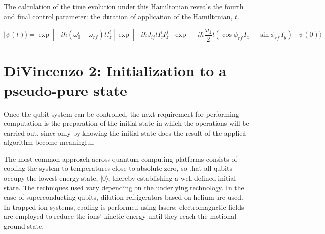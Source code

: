 The calculation of the time evolution under this Hamiltonian reveals the fourth and final control parameter: the duration of application of the Hamiltonian, \(t\).

\begin{equation}
\lvert\psi(t)\rangle =
\exp\!\left[-i\hbar(\omega_{0}^i-\omega_{rf})tI_z^i\right]
\exp\!\left[-i\hbar J_{ij}tI_z^i I_z^j\right]
\exp\!\left[-i\hbar\frac{\omega_1}{2}t
\left(\cos\phi_{rf}\,I_x-\sin\phi_{rf}\,I_y\right)\right]
\lvert\psi(0)\rangle
\label{eq:temporal_evo}
\end{equation}


\newpage
\section{DiVincenzo 2: Initialization to a pseudo-pure state}
\label{Divincenzo2}

Once the qubit system can be controlled, the next requirement for performing computation is the preparation of the initial state in which the operations will be carried out, since only by knowing the initial state does the result of the applied algorithm become meaningful.

The most common approach across quantum computing platforms consists of cooling the system to temperatures close to absolute zero, so that all qubits occupy the lowest-energy state, \(\lvert 0 \rangle\), thereby establishing a well-defined initial state. The techniques used vary depending on the underlying technology. In the case of superconducting qubits, dilution refrigerators based on helium are used. In trapped-ion systems, cooling is performed using lasers: electromagnetic fields are employed to reduce the ions’ kinetic energy until they reach the motional ground state.


